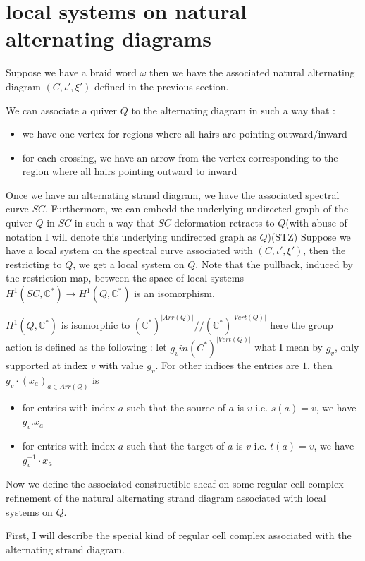 \section{local systems on natural alternating diagrams}
Suppose we have a braid word $\omega$ then we have the associated natural alternating diagram $(C, \iota', \xi')$ defined in the previous section.

We can associate a quiver $Q$ to the alternating diagram in such a way that :
\begin{itemize}
\item we have one vertex for regions where all hairs are pointing outward/inward
\item for each crossing, we have an arrow from the vertex corresponding to the region where all hairs pointing outward to inward
\end{itemize}

Once we have an alternating strand diagram, we have the associated spectral curve $SC$. Furthermore, we can embedd the underlying undirected graph of the quiver $Q$ in $SC$ in such a way that $SC$ deformation retracts to $Q$(with abuse of notation I will denote this underlying undirected graph as $Q$)(STZ)
Suppose we have a local system on the spectral curve associated with $(C, \iota', \xi')$, then the restricting to $Q$, we get a local system on $Q$. Note that the pullback, induced by the restriction map, between the space of local systems $H^1(SC, \mathbb{C}^*) \rightarrow  H^1(Q,\mathbb{C}^*)$ is an isomorphism.

$H^1(Q,\mathbb{C}^*)$ is isomorphic to $(\mathbb{C}^*)^{|Arr(Q)|}//(\mathbb{C}^*)^{|Vert(Q)|}$
here the group action is defined as the following : let $g_v in (C^*)^{|Vert(Q)|}$
what I mean by $g_v$, only supported at index $v$ with value $g_v$. For other indices the entries are $1$.
then $g_v \cdot (x_a)_{a\in Arr(Q)}$ is 
\begin{itemize}
\item for entries with index $a$ such that the source of $a$ is $v$ i.e. $s(a) = v$, we have $g_v.x_a$
\item for entries with index $a$ such that the target of $a$ is $v$ i.e. $t(a) = v$, we have $g_v^{-1}\cdot x_a$
\end{itemize}


Now we define the associated constructible sheaf on some regular cell complex refinement of the natural alternating strand diagram associated with local systems on $Q$.

First, I will describe the special kind of regular cell complex associated with the alternating strand diagram. 

